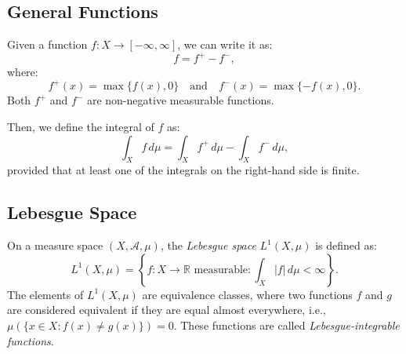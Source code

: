 \documentclass[11pt]{article}
\begin{document}
\subsection{General Functions}
Given a function \(f: X \to [-\infty, \infty]\), we can write it as:
\[f = f^+ - f^-,\]
where:
\[f^+(x) = \max\{f(x), 0\} \quad \text{and} \quad f^-(x) = \max\{-f(x), 0\}.\]
Both \(f^+\) and \(f^-\) are non-negative measurable functions.

\begin{center}
\end{center}

Then, we define the integral of \(f\) as:
\[\int_X f \,d\mu = \int_X f^+ \,d\mu - \int_X f^- \,d\mu,\]
provided that at least one of the integrals on the right-hand side is finite.

\subsection{Lebesgue Space}
On a measure space \((X, \mathcal{A}, \mu)\), the \textit{Lebesgue space} \(L^1(X, \mu)\) is defined as:
\[L^1(X, \mu) = \left\{f: X \to \mathbb{R} \text{ measurable} : \int_X |f| \,d\mu < \infty\right\}.\]
The elements of \(L^1(X, \mu)\) are equivalence classes, where two functions \(f\) and \(g\) are considered equivalent if they are equal almost everywhere, i.e., \(\mu(\{x \in X : f(x) \neq g(x)\}) = 0\). These functions are called \textit{Lebesgue-integrable functions}.
\end{document}
